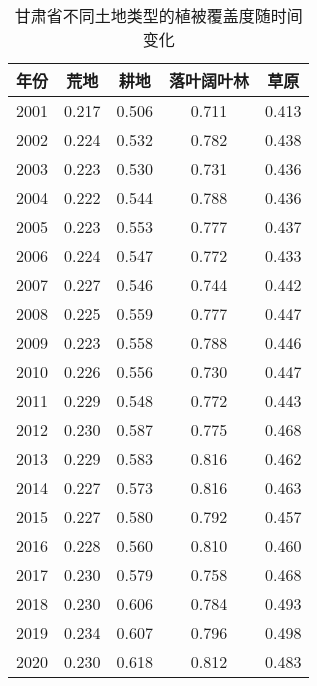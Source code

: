\documentclass[AutoFakeBold]{LZUThesis-PgD&PhD}
\begin{document}
		\begin{table}[H]
			\centering
			\begin{tabular}{|c|c|c|c|c|}
				\hline
				\textbf{年份} & \textbf{荒地} & \textbf{耕地} & \textbf{落叶阔叶林} & \textbf{草原} \\
				\hline
				2001 & 0.217 & 0.506 & 0.711 & 0.413 \\
				2002 & 0.224 & 0.532 & 0.782 & 0.438 \\
				2003 & 0.223 & 0.530 & 0.731 & 0.436 \\
				2004 & 0.222 & 0.544 & 0.788 & 0.436 \\
				2005 & 0.223 & 0.553 & 0.777 & 0.437 \\
				2006 & 0.224 & 0.547 & 0.772 & 0.433 \\
				2007 & 0.227 & 0.546 & 0.744 & 0.442 \\
				2008 & 0.225 & 0.559 & 0.777 & 0.447 \\
				2009 & 0.223 & 0.558 & 0.788 & 0.446 \\
				2010 & 0.226 & 0.556 & 0.730 & 0.447 \\
				2011 & 0.229 & 0.548 & 0.772 & 0.443 \\
				2012 & 0.230 & 0.587 & 0.775 & 0.468 \\
				2013 & 0.229 & 0.583 & 0.816 & 0.462 \\
				2014 & 0.227 & 0.573 & 0.816 & 0.463 \\
				2015 & 0.227 & 0.580 & 0.792 & 0.457 \\
				2016 & 0.228 & 0.560 & 0.810 & 0.460 \\
				2017 & 0.230 & 0.579 & 0.758 & 0.468 \\
				2018 & 0.230 & 0.606 & 0.784 & 0.493 \\
				2019 & 0.234 & 0.607 & 0.796 & 0.498 \\
				2020 & 0.230 & 0.618 & 0.812 & 0.483 \\
				\hline
			\end{tabular}
			\caption{甘肃省不同土地类型的植被覆盖度随时间变化}
		\end{table}
\end{document}
